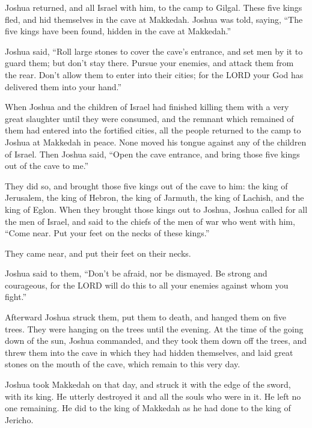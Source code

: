  Joshua returned, and all Israel with him, to the camp to
Gilgal.  These five kings fled, and hid themselves in the
cave at Makkedah.  Joshua was told, saying, ``The five
kings have been found, hidden in the cave at Makkedah.''

 Joshua said, ``Roll large stones to cover the cave's
entrance, and set men by it to guard them;  but don't
stay there. Pursue your enemies, and attack them from the rear. Don't
allow them to enter into their cities; for the LORD your God has
delivered them into your hand.''

 When Joshua and the children of Israel had finished
killing them with a very great slaughter until they were consumed, and
the remnant which remained of them had entered into the fortified
cities,  all the people returned to the camp to Joshua at
Makkedah in peace. None moved his tongue against any of the children of
Israel.  Then Joshua said, ``Open the cave entrance, and
bring those five kings out of the cave to me.''

 They did so, and brought those five kings out of the
cave to him: the king of Jerusalem, the king of Hebron, the king of
Jarmuth, the king of Lachish, and the king of Eglon. 
When they brought those kings out to Joshua, Joshua called for all the
men of Israel, and said to the chiefs of the men of war who went with
him, ``Come near. Put your feet on the necks of these kings.''

They came near, and put their feet on their necks.

 Joshua said to them, ``Don't be afraid, nor be dismayed.
Be strong and courageous, for the LORD will do this to all your enemies
against whom you fight.''

 Afterward Joshua struck them, put them to death, and
hanged them on five trees. They were hanging on the trees until the
evening.  At the time of the going down of the sun,
Joshua commanded, and they took them down off the trees, and threw them
into the cave in which they had hidden themselves, and laid great stones
on the mouth of the cave, which remain to this very day.

 Joshua took Makkedah on that day, and struck it with the
edge of the sword, with its king. He utterly destroyed it and all the
souls who were in it. He left no one remaining. He did to the king of
Makkedah as he had done to the king of Jericho.

